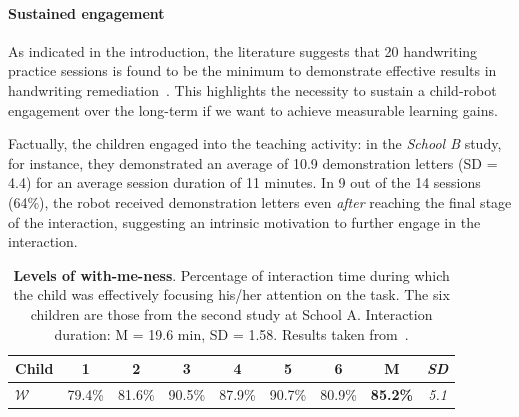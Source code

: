 \documentclass{article}
\begin{document}
\paragraph{Sustained engagement}

As indicated in the introduction, the literature suggests that 20 handwriting
practice sessions is found to be the minimum to demonstrate effective results in
handwriting remediation~\cite{Hoy2011}. This highlights the necessity to sustain
a child-robot engagement over the long-term if we want to achieve measurable learning gains.

Factually, the children engaged into the teaching activity: in the
\textit{School B} study, for instance, they demonstrated an average of
10.9 demonstration letters (SD = 4.4) for an average session duration of 11 minutes.
In 9 out of the 14 sessions (64\%), the robot
received demonstration letters even \emph{after} reaching the final stage of the
interaction, suggesting an intrinsic motivation to further engage in the
interaction.


\begin{table}[h!]
    \centering
    \caption{\textbf{Levels of with-me-ness}. Percentage of interaction time
        during which the child was effectively focusing his/her attention on the
        task. The six children are those from the second study at School A.
        Interaction duration: M = 19.6 min, SD = 1.58. Results
        taken from~\cite{lemaignan2016realtime}.}

    \begin{tabular}{p{1cm}cccccccc}
        \toprule
        Child & 1 & 2 & 3 & 4 & 5 & 6 & {\bf M} & {\it SD} \\
        \midrule
        $\mathcal{W}$ & 79.4\% & 81.6\%  & 90.5\% & 87.9\% & 90.7\% & 80.9\% & {\bf 85.2\%} & {\it 5.1} \\ 
        \bottomrule
    \end{tabular}
    \label{tab:results-with-me-ness}
\end{table}
\end{document}
